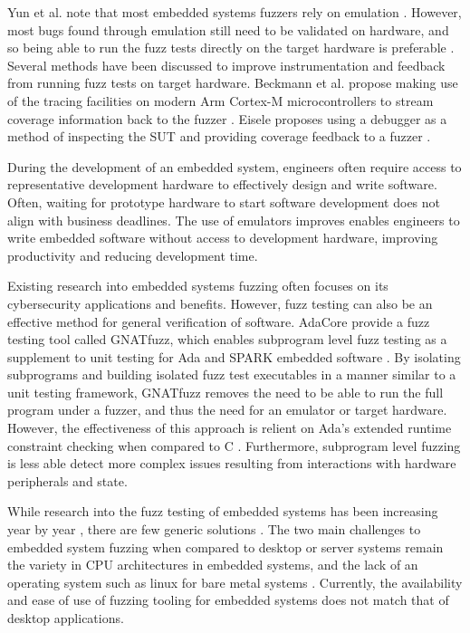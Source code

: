 \documentclass[../report.tex]{subfiles}
\begin{document}
Yun et al. note that most embedded systems fuzzers rely on emulation
\citep{Yun_2022}. However, most bugs found through emulation still need to be
validated on hardware, and so being able to run the fuzz tests directly on the
target hardware is preferable \citep{Eisele_et_al_2022}. Several methods have
been discussed to improve instrumentation and feedback from running fuzz tests
on target hardware. Beckmann et al. propose making use of the tracing
facilities on modern Arm Cortex-M microcontrollers to stream coverage
information back to the fuzzer \citep{Beckmann_2023}. Eisele proposes using a
debugger as a method of inspecting the SUT and providing coverage feedback to a
fuzzer \citep{Eisele_2022}.

During the development of an embedded system, engineers often require access to
representative development hardware to effectively design and write software.
Often, waiting for prototype hardware to start software development does not
align with business deadlines. The use of emulators improves enables engineers
to write embedded software without access to development hardware, improving
productivity and reducing development time.

Existing research into embedded systems fuzzing often focuses on its
cybersecurity applications and benefits. However, fuzz testing can also be an
effective method for general verification of software. AdaCore provide a fuzz
testing tool called GNATfuzz, which enables subprogram level fuzz testing as a
supplement to unit testing for Ada and SPARK embedded software
\citep{gnatfuzz}. By isolating subprograms and building isolated fuzz test
executables in a manner similar to a unit testing framework, GNATfuzz removes
the need to be able to run the full program under a fuzzer, and thus the need
for an emulator or target hardware. However, the effectiveness of this approach
is relient on Ada's extended runtime constraint checking when compared to C
\citep{gnatfuzz}. Furthermore, subprogram level fuzzing is less able detect
more complex issues resulting from interactions with hardware peripherals and
state.

While research into the fuzz testing of embedded systems has been increasing
year by year \citep{Yun_2022}, there are few generic solutions
\citep{Eisele_et_al_2022}. The two main challenges to embedded system fuzzing
when compared to desktop or server systems remain the variety in CPU
architectures in embedded systems, and the lack of an operating system such as
linux for bare metal systems \citep{Eisele_et_al_2022}. Currently, the
availability and ease of use of fuzzing tooling for embedded systems does not
match that of desktop applications.
\end{document}
